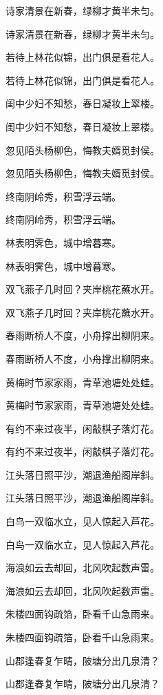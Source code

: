 \documentclass[12pt, a4paper, addpoints]{exam}
\begin{document}
\begin{questions}
\question[3] 诗家清景在新春，绿柳才黄半未匀。

\question[3] 诗家清景在新春，绿柳才黄半未匀。

\question[3] 若待上林花似锦，出门俱是看花人。

\question[3] 若待上林花似锦，出门俱是看花人。

\question[3] 闺中少妇不知愁，春日凝妆上翠楼。

\question[3] 闺中少妇不知愁，春日凝妆上翠楼。

\question[3] 忽见陌头杨柳色，悔教夫婿觅封侯。

\question[3] 忽见陌头杨柳色，悔教夫婿觅封侯。

\question[3] 终南阴岭秀，积雪浮云端。

\question[3] 终南阴岭秀，积雪浮云端。

\question[3] 林表明霁色，城中增暮寒。

\question[3] 林表明霁色，城中增暮寒。

\question[3] 双飞燕子几时回？夹岸桃花蘸水开。

\question[3] 双飞燕子几时回？夹岸桃花蘸水开。

\question[3] 春雨断桥人不度，小舟撑出柳阴来。

\question[3] 春雨断桥人不度，小舟撑出柳阴来。

\question[3] 黄梅时节家家雨，青草池塘处处蛙。

\question[3] 黄梅时节家家雨，青草池塘处处蛙。

\question[3] 有约不来过夜半，闲敲棋子落灯花。

\question[3] 有约不来过夜半，闲敲棋子落灯花。

\question[3] 江头落日照平沙，潮退渔船阁岸斜。

\question[3] 江头落日照平沙，潮退渔船阁岸斜。

\question[3] 白鸟一双临水立，见人惊起入芦花。

\question[3] 白鸟一双临水立，见人惊起入芦花。

\question[3] 海浪如云去却回，北风吹起数声雷。

\question[3] 海浪如云去却回，北风吹起数声雷。

\question[3] 朱楼四面钩疏箔，卧看千山急雨来。

\question[3] 朱楼四面钩疏箔，卧看千山急雨来。

\question[3] 山郡逢春复乍晴，陂塘分出几泉清？

\question[3] 山郡逢春复乍晴，陂塘分出几泉清？


\end{questions}
\end{document}
